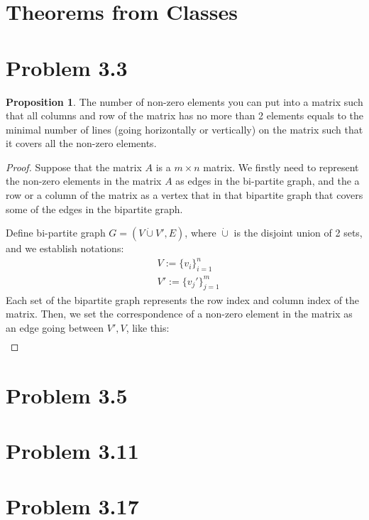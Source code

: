 \documentclass[]{article}
\theoremstyle{definition}
\newtheorem{prop}{Proposition}[section]  %
\begin{document}
\section{Theorems from Classes}

\section{Problem 3.3}
    \begin{prop}
        The number of non-zero elements you can put into a matrix such that all columns and row of the matrix has no more than 2 elements equals to the minimal number of lines (going horizontally or vertically) on the matrix such that it covers all the non-zero elements. 
    \end{prop}
    \begin{proof}
        Suppose that the matrix $A$ is a $m\times n$ matrix. We firstly need to represent the non-zero elements in the matrix $A$ as edges in the bi-partite graph, and the a row or a column of the matrix as a vertex that in that bipartite graph that covers some of the edges in the bipartite graph. 
        \par
        Define bi-partite graph $G = (V \dot{\cup}V', E)$, where $\dot{\cup}$ is the disjoint union of 2 sets, and we establish notations: 
        \begin{align}
            & V := \{v_i\}_{i = 1}^{n}
            \\
            & V' := \{v_j'\}_{j = 1}^{m}
        \end{align}
        Each set of the bipartite graph represents the row index and column index of the matrix. Then, we set the correspondence of a non-zero element in the matrix as an edge going between $V', V$, like this: 
        \begin{align}
            
        \end{align}
    \end{proof}
\section{Problem 3.5}
\section{Problem 3.11}
\section{Problem 3.17}
\end{document}
